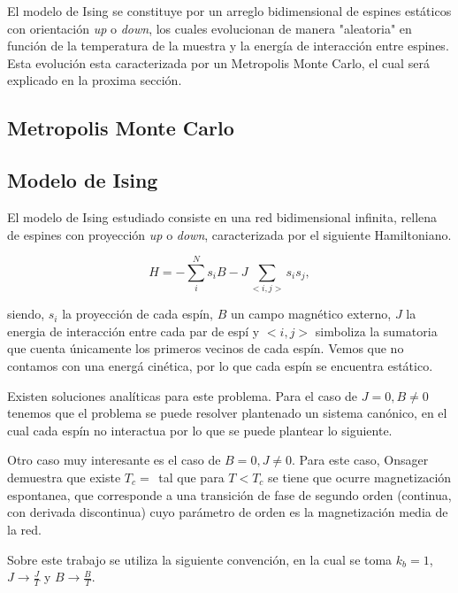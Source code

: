 \documentclass[%
 reprint,
 amsmath,amssymb,
 aps,
]{revtex4-1}
\begin{document}
El modelo de Ising se constituye por un arreglo bidimensional de espines
est\'aticos con orientaci\'on \textit{up} o \textit{down}, los cuales
evolucionan de manera "aleatoria" en funci\'on de la temperatura de la muestra
y la energ\'ia de interacci\'on entre espines. Esta evoluci\'on esta
caracterizada por un Metropolis Monte Carlo, el cual ser\'a explicado en la
proxima secci\'on.

\subsection{\label{transition}Metropolis Monte Carlo}

\subsection{\label{transition}Modelo de Ising}

El modelo de Ising estudiado consiste en una red bidimensional infinita,
rellena de espines con proyecci\'on \textit{up} o \textit{down}, caracterizada
por el siguiente Hamiltoniano.

\begin{equation}
  H = - \sum_i^N s_i B - J \sum_{<i, j>} s_i s_j,
\end{equation}

siendo, $s_i$ la proyecci\'on de cada esp\'in, $B$ un campo magn\'etico externo,
$J$ la energia de interacci\'on entre cada par de esp\'i y $<i, j>$ simboliza la
sumatoria que cuenta \'unicamente los primeros vecinos de cada esp\'in. Vemos que
no contamos con una energ\'a cin\'etica, por lo que cada esp\'in se encuentra
est\'atico.

Existen soluciones anal\'iticas para este problema. Para el caso de $J = 0, B
\neq 0$ tenemos que el problema se puede resolver plantenado un sistema
can\'onico, en el cual cada esp\'in no interactua por lo que se puede plantear
lo siguiente.


Otro caso muy interesante es el caso de $B = 0, J \neq 0$. Para este caso,
Onsager\cite{Onsager} demuestra que existe $T_c = \frac{}{}$ tal que para $T <
T_c$ se tiene que ocurre magnetizaci\'on espontanea, que corresponde a una
transici\'on de fase de segundo orden (continua, con derivada discontinua) cuyo
par\'ametro de orden es la magnetizaci\'on media de la red.

Sobre este trabajo se utiliza la siguiente convenci\'on, en la cual se toma
$k_b = 1$, $J \rightarrow \frac{J}{T}$ y $B \rightarrow \frac{B}{T}$.
\end{document}
